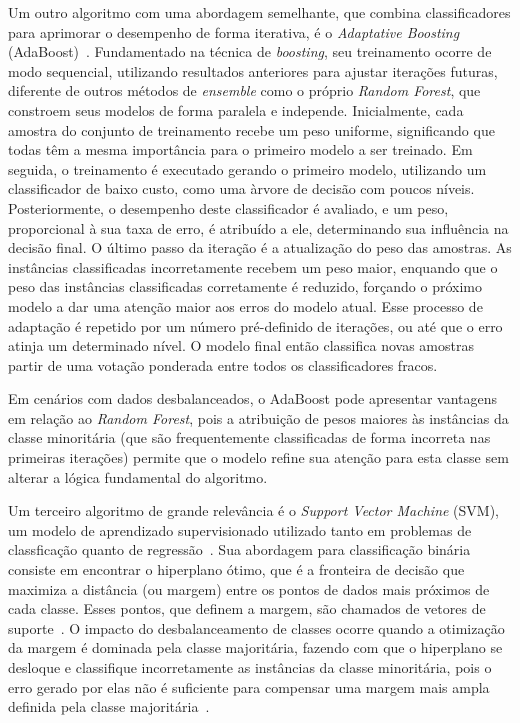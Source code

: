 Um outro algoritmo com uma abordagem semelhante, que combina classificadores para aprimorar o desempenho de forma iterativa, é o \textit{Adaptative Boosting} (AdaBoost)~\cite{Tang2021}. Fundamentado na técnica de \textit{boosting}, seu treinamento ocorre de modo sequencial, utilizando resultados anteriores para ajustar iterações futuras, diferente de outros métodos de \textit{ensemble} como o próprio \textit{Random Forest}, que constroem seus modelos de forma paralela e independe. Inicialmente, cada amostra do conjunto de treinamento recebe um peso uniforme, significando que todas têm a mesma importância para o primeiro modelo a ser treinado. Em seguida, o treinamento é executado gerando o primeiro modelo, utilizando um classificador de baixo custo, como uma àrvore de decisão com poucos níveis. Posteriormente, o desempenho deste classificador é avaliado, e um peso, proporcional à sua taxa de erro, é atribuído a ele, determinando sua influência na decisão final. O último passo da iteração é a atualização do peso das amostras. As instâncias classificadas incorretamente recebem um peso maior, enquando que o peso das instâncias classificadas corretamente é reduzido, forçando o próximo modelo a dar uma atenção maior aos erros do modelo atual. Esse processo de adaptação é repetido por um número pré-definido de iterações, ou até que o erro atinja um determinado nível. O modelo final então classifica novas amostras partir de uma votação ponderada entre todos os classificadores fracos.

Em cenários com dados desbalanceados, o AdaBoost pode apresentar vantagens em relação ao \textit{Random Forest}, pois a atribuição de pesos maiores às instâncias da classe minoritária (que são frequentemente classificadas de forma incorreta nas primeiras iterações) permite que o modelo refine sua atenção para esta classe sem alterar a lógica fundamental do algoritmo.

Um terceiro algoritmo de grande relevância é o \textit{Support Vector Machine} (SVM), um modelo de aprendizado supervisionado utilizado tanto em problemas de classficação quanto de regressão~\cite{Farquad2012}. Sua abordagem para classificação binária consiste em encontrar o hiperplano ótimo, que é a fronteira de decisão que maximiza a distância (ou margem) entre os pontos de dados mais próximos de cada classe. Esses pontos, que definem a margem, são chamados de vetores de suporte~\cite{Vapnik2013}. O impacto do desbalanceamento de classes ocorre quando a otimização da margem é dominada pela classe majoritária, fazendo com que o hiperplano se desloque e classifique incorretamente as instâncias da classe minoritária, pois o erro gerado por elas não é suficiente para compensar uma margem mais ampla definida pela classe majoritária~\cite{Daskalaki2006}.


